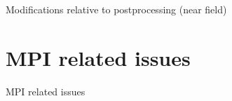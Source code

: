 \documentclass[smaller,xcolor=table,dvipsnames]{beamer}
\newcommand{\dirinputtex}{./inputtex}
\begin{document}
  \begin{frame}[plain]
    \centering \Large{Modifications relative to postprocessing (near
      field)}
    
  \end{frame}
  
  
  

  \section{MPI related issues}
  
  \begin{frame}[plain,label=MPI]
    \centering    \Large{MPI related issues}
  \end{frame}


  


  
\end{document}
